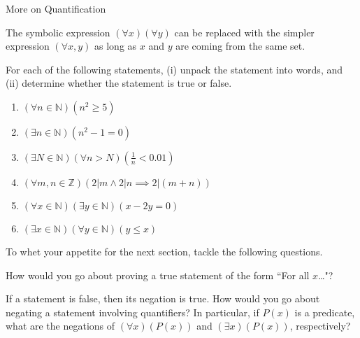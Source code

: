\begin{section}{More on Quantification}
\begin{remark}
The symbolic expression $(\forall x)(\forall y)$ can be replaced with the simpler expression $(\forall x,y)$ as long as $x$ and $y$ are coming from the same set.
\end{remark}

\begin{exercise}
For each of the following statements, (i) unpack the statement into words, and (ii) determine whether the statement is true or false.

\begin{enumerate}
\item $(\forall n \in \mathbb{N})(n^2 \geq 5)$
\item $(\exists n \in \mathbb{N})(n^2-1=0)$
\item $(\exists N \in \mathbb{N})(\forall  n > N)(\frac{1}{n} < 0.01)$
\item $(\forall m, n \in \mathbb{Z})(2|m \wedge 2|n \implies 2|(m+n))$
\item $(\forall x \in \mathbb{N})(\exists y \in \mathbb{N})(x-2y=0)$
\item $(\exists x \in \mathbb{N})(\forall y \in \mathbb{N})(y \leq x)$
\end{enumerate}
\end{exercise}

To whet your appetite for the next section, tackle the following questions.

\begin{question}
How would you go about proving a true statement of the form ``For all $x$\ldots"?
\end{question}

\begin{question}
If a statement is false, then its negation is true.  How would you go about negating a statement involving quantifiers?  In particular, if $P(x)$ is a predicate, what are the negations of $(\forall x)(P(x))$ and $(\exists x)(P(x))$, respectively?
\end{question}

\end{section}